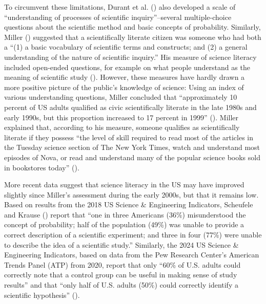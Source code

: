 \documentclass[
  jou,
  floatsintext,
  longtable,
  nolmodern,
  notxfonts,
  notimes,
  colorlinks=true,linkcolor=blue,citecolor=blue,urlcolor=blue]{apa7}
\begin{document}
To circumvent these limitations, Durant et al.
() also
developed a scale of ``understanding of processes of scientific
inquiry''--several multiple-choice questions about the scientific method
and basic concepts of probability. Similarly, Miller
()
suggested that a scientifically literate citizen was someone who had
both a ``(1) a basic vocabulary of scientific terms and constructs; and
(2) a general understanding of the nature of scientific inquiry.'' His
measure of science literacy included open-ended questions, for example
on what people understand as the meaning of scientific study
().
However, these measures have hardly drawn a more positive picture of the
public's knowledge of science: Using an index of various understanding
questions, Miller concluded that ``approximately 10 percent of US adults
qualified as civic scientifically literate in the late 1980s and early
1990s, but this proportion increased to 17 percent in 1999''
(). Miller explained that, according to his measure, someone
qualifies as scientifically literate if they possess ``the level of
skill required to read most of the articles in the Tuesday science
section of The New York Times, watch and understand most episodes of
Nova, or read and understand many of the popular science books sold in
bookstores today''
().

More recent data suggest that science literacy in the US may have
improved slightly since Miller's assessment during the early 2000s, but
that it remains low. Based on results from the 2018 US Science \&
Engineering Indicators, Scheufele and Krause
() report that ``one in three Americans (36\%) misunderstood the
concept of probability; half of the population (49\%) was unable to
provide a correct description of a scientific experiment; and three in
four (77\%) were unable to describe the idea of a scientific study.''
Similarly, the 2024 US Science \& Engineering Indicators, based on data
from the Pew Research Center's American Trends Panel (ATP) from 2020,
report that only ``60\% of U.S. adults could correctly note that a
control group can be useful in making sense of study results'' and that
``only half of U.S. adults (50\%) could correctly identify a scientific
hypothesis''
().
\end{document}
